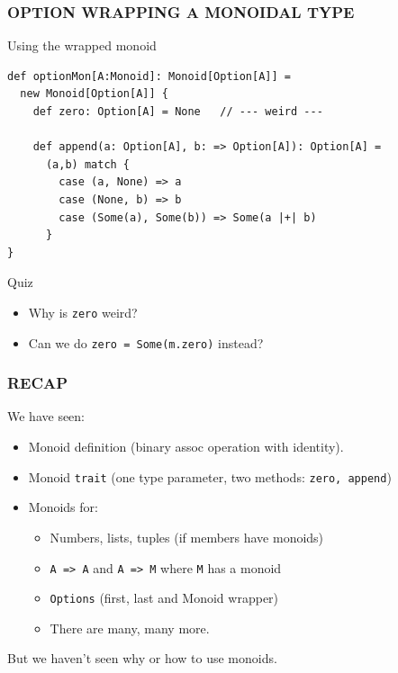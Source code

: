 \documentclass{beamer}
\begin{document}
\begin{frame}[fragile] \frametitle{OPTION WRAPPING A MONOIDAL TYPE}
  \begin{block}{Using the wrapped monoid}
  \begin{lstlisting}
def optionMon[A:Monoid]: Monoid[Option[A]] =
  new Monoid[Option[A]] {
    def zero: Option[A] = None   // --- weird ---

    def append(a: Option[A], b: => Option[A]): Option[A] =
      (a,b) match {
        case (a, None) => a
        case (None, b) => b
        case (Some(a), Some(b)) => Some(a |+| b)
      }
}
  \end{lstlisting}
  \end{block}

  \begin{block}{Quiz}
    \begin{itemize}
      \item Why is \texttt{zero} weird?
      \item Can we do \texttt{zero = Some(m.zero)} instead?
    \end{itemize}
  \end{block}
\end{frame}

\begin{frame} \frametitle{RECAP}
  We have seen:
  \begin{itemize}
    \item Monoid definition (binary assoc operation with identity).
    \item Monoid \texttt{trait} (one type parameter,
      two methods: \texttt{zero, append})
    \item Monoids for:
      \begin{itemize}
      \item Numbers, lists, tuples (if members have monoids)
      \item \texttt{A => A} and \texttt{A => M} where \texttt{M} has a monoid
      \item \texttt{Options} (first, last and Monoid wrapper)
      \item There are many, many more.
      \end{itemize}
  \end{itemize}

  \begin{block}{}
    \centering
    But we haven't seen \alert{why} or \alert{how} to use monoids.
  \end{block}
\end{frame}
\end{document}
